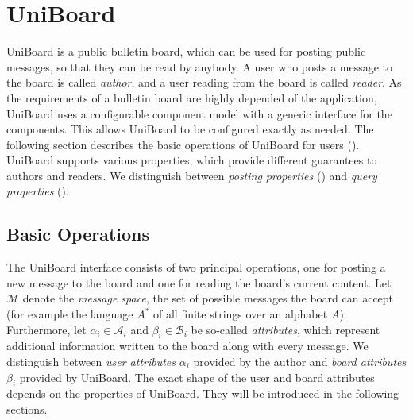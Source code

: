 \documentclass[bibtotoc,halfparskip,oneside]{scrreprt}
\begin{document}
	\chapter{UniBoard}\label{ub}
	
	UniBoard is a public bulletin board, which can be used for posting public messages, so that they can be read by anybody.
	A user who posts a message to the board is called \emph{author}, and a user reading from the board is called \emph{reader}. As the requirements of a bulletin board are highly depended of the application, UniBoard uses a configurable component model with a generic interface for the components. This allows UniBoard to be configured exactly as needed. The following section describes the basic operations of UniBoard for users (). UniBoard supports various properties, which provide different guarantees to authors and readers. We distinguish between \emph{posting properties} () and \emph{query properties} ().
	
	\section{Basic Operations}\label{ub1}
	
	The UniBoard interface consists of two principal operations, one for posting a new message to the board and one for reading the board's current content. Let $\mathcal{M}$ denote the \emph{message space}, the set of possible messages the board can accept (for example the language $A^*$ of all finite strings over an alphabet $A$). Furthermore, let $\alpha_i\in\mathcal{A}_i$ and $\beta_i\in\mathcal{B}_i$ be so-called \emph{attributes}, which represent additional information  written to the board along with every message. We distinguish between \emph{user attributes} $\alpha_i$ provided by the author and \emph{board attributes} $\beta_i$ provided by UniBoard. The exact shape of the user and board attributes depends on the properties of UniBoard. They will be introduced in the following sections.
	
\end{document}
